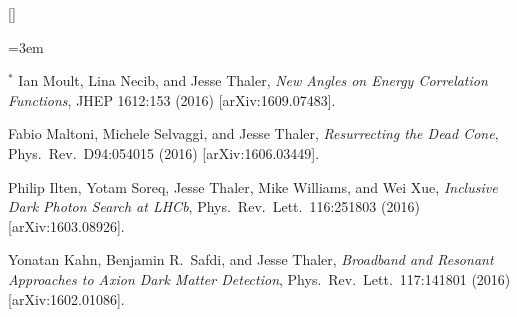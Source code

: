 \begin{list}{[]\addtocounter{jessecount}{-1}}{\leftmargin=3em \itemsep=4pt}
\item
${}^\ast$ Ian Moult, Lina Necib, and Jesse Thaler,
\emph{New Angles on Energy Correlation Functions},
JHEP 1612:153 (2016)
[arXiv:1609.07483].

\item
 Fabio Maltoni, Michele Selvaggi, and Jesse Thaler,
\emph{Resurrecting the Dead Cone},
Phys.\ Rev.\ D94:054015 (2016)
[arXiv:1606.03449].

\item
 Philip Ilten, Yotam Soreq, Jesse Thaler, Mike Williams, and Wei Xue,
\emph{Inclusive Dark Photon Search at LHCb},
Phys.\ Rev.\ Lett.\ 116:251803 (2016)
[arXiv:1603.08926].

\item
 Yonatan Kahn, Benjamin R.\ Safdi, and Jesse Thaler,
\emph{Broadband and Resonant Approaches to Axion Dark Matter Detection},
Phys.\ Rev.\ Lett.\ 117:141801 (2016)
[arXiv:1602.01086].

\end{list}
